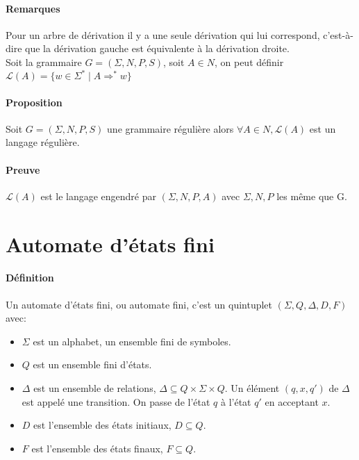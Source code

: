 

\paragraph{Remarques} %
\label{par:remarques}

Pour un arbre de dérivation il y a une seule dérivation qui lui correspond, c'est-à-dire que la dérivation gauche est équivalente à la dérivation droite.\\


Soit la grammaire $G=(\Sigma,N,P,S)$, soit $A \in N$, on peut définir $\mathcal{L}(A)=\{ w \in \Sigma^* \mid A \Rightarrow^* w \}$


\paragraph{Proposition} %
\label{par:proposition}

Soit $G=(\Sigma,N,P,S)$ une grammaire régulière alors $\forall A \in N, \mathcal{L}(A)$ est un langage régulière.



\paragraph{Preuve} %
\label{par:preuve}

$\mathcal{L}(A)$ est le langage engendré par $(\Sigma,N,P,A)$ avec $\Sigma,N,P$ les même que G.





\section{Automate d'états fini} %
\label{sec:automate_d_tats_fini}

\paragraph{Définition} %
\label{par:d_finition}

Un automate d'états fini, ou automate fini, c'est un quintuplet $(\Sigma,Q,\Delta,D,F)$ avec:

\begin{itemize}
	\item $\Sigma$ est un alphabet, un ensemble fini de symboles.
	\item $Q$ est un ensemble fini d'états.
	\item $\Delta$ est un ensemble de relations, $\Delta \subseteq Q \times \Sigma \times Q$. Un élément $(q,x,q')$ de $\Delta$ est appelé une transition. On passe de l'état $q$ à l'état $q'$ en acceptant $x$.
	\item $D$ est l'ensemble des états initiaux, $D \subseteq Q$.
	\item $F$ est l'ensemble des états finaux, $F \subseteq Q$.
\end{itemize}

